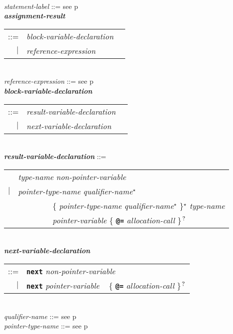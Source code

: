 \documentclass[12pt]{article}
\newcommand{\TT}[1]{{\tt \bfseries #1}}
\newcommand{\STAR}{{\Large $^\star$}}
\newcommand{\QMARK}{{$^{\,\mbox{\footnotesize ?}}$}}
\newcommand{\ttkey}[1]{{\tt \bfseries #1}}
\newcommand{\emkey}[1]{{\em \bfseries #1}}
\newcommand{\pagref}[1]{p\pageref{#1}}
\newenvironment{indpar}[1][0.3in]%
	{\begin{list}{}%
		     {\setlength{\itemsep}{0in}%
		      \setlength{\topsep}{0in}%
		      \setlength{\parsep}{1ex}%
		      \setlength{\labelwidth}{#1}%
		      \setlength{\leftmargin}{#1}%
		      \addtolength{\leftmargin}{\labelsep}}%
	 \item}%
	{\end{list}}
\begin{document}
\begin{indpar}
\\[0.5ex]
{\em statement-label} ::= see \pagref{STATEMENT-LABEL}
\\[0.5ex]
\emkey{assignment-result}\label{ASSIGNMENT-RESULT}
    \begin{tabular}[t]{@{}rll}
    ::= & {\em block-variable-declaration} \\
    $|$ & {\em reference-expression}
    \end{tabular}
\\[0.5ex]
{\em reference-expression} ::= see \pagref{REFERENCE-EXPRESSIONS}
\\[0.5ex]
\emkey{block-variable-declaration}\label{BLOCK-VARIABLE-DECLARATION}
    \begin{tabular}[t]{@{}rll}
    ::= & {\em result-variable-declaration} \\
    $|$ & {\em next-variable-declaration} \\
    \end{tabular}
\\[0.5ex]
\emkey{result-variable-declaration}\label{RESULT-VARIABLE-DECLARATION} ::= \\
\hspace*{0.5in}\begin{tabular}{rl}
	    & {\em type-name} {\em non-pointer-variable} \\
	$|$ & {\em pointer-type-name} {\em qualifier-name}\STAR{} \\
	    & ~~~~~~~~ \{ {\em pointer-type-name} {\em qualifier-name}\STAR{}
	               \}\STAR{} {\em type-name} \\
	    & ~~~~~~~~ {\em pointer-variable}
	               \{ \TT{@=} {\em allocation-call} \}\QMARK{} \\
	\end{tabular}
\\[0.5ex]
\emkey{next-variable-declaration}\label{NEXT-VARIABLE-DECLARATION} \\
\hspace*{0.5in}\begin{tabular}{rl}
      ::= & \ttkey{next} {\em non-pointer-variable} \\
      $|$ & \ttkey{next} {\em pointer-variable}
	      ~ \{ \TT{@=} {\em allocation-call} \}\QMARK{} \\
      \end{tabular}
\\[0.5ex]
{\em qualifier-name} ::= see \pagref{QUALIFIER-NAME}
\\[0.5ex]
{\em pointer-type-name} ::= see \pagref{POINTER-TYPE-NAME}

\end{indpar}
\end{document}
